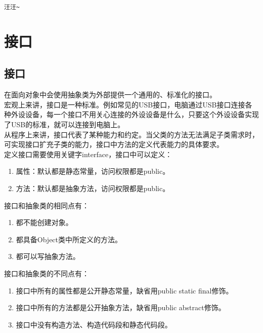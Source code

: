 \begin{tcolorbox}
	\begin{verbatim}
汪汪~
	\end{verbatim}
\end{tcolorbox}

\newpage

\section{接口}

\subsection{接口}

在面向对象中会使用抽象类为外部提供一个通用的、标准化的接口。\\

宏观上来讲，接口是一种标准。例如常见的USB接口，电脑通过USB接口连接各种外设设备，每一个接口不用关心连接的外设设备是什么，只要这个外设设备实现了USB的标准，就可以连接到电脑上。\\

从程序上来讲，接口代表了某种能力和约定。当父类的方法无法满足子类需求时，可实现接口扩充子类的能力，接口中方法的定义代表能力的具体要求。\\

定义接口需要使用关键字interface，接口中可以定义：

\begin{enumerate}
	\item 属性：默认都是静态常量，访问权限都是public。
	\item 方法：默认都是抽象方法，访问权限都是public。
\end{enumerate}

接口和抽象类的相同点有：

\begin{enumerate}
	\item 都不能创建对象。
	\item 都具备Object类中所定义的方法。
	\item 都可以写抽象方法。
\end{enumerate}

接口和抽象类的不同点有：

\begin{enumerate}
	\item 接口中所有的属性都是公开静态常量，缺省用public static final修饰。
	\item 接口中所有的方法都是公开抽象方法，缺省用public abstract修饰。
	\item 接口中没有构造方法、构造代码段和静态代码段。
\end{enumerate}

